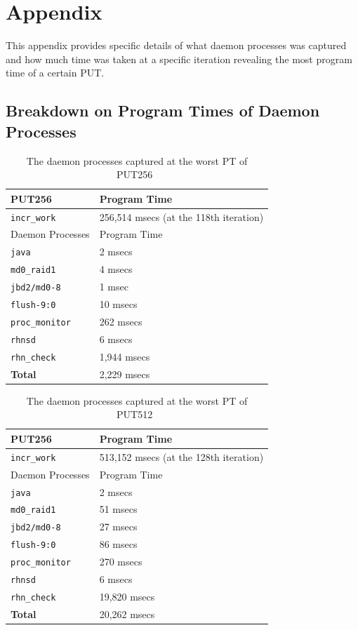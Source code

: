 \documentclass[10pt]{article}
\begin{document}
\clearpage
\newpage
\section{Appendix}
This appendix provides specific details of what daemon processes 
was captured and how much time was taken at a specific iteration revealing the most program time of a certain PUT.

\subsection{Breakdown on Program Times of Daemon Processes}
\begin{table}[htp!]
\centering
{
 \begin{tabular}{|l|l|} \hline
PUT256  & Program Time \\ \hline
{\tt incr\_work} & 256,514 msecs (at the 118th iteration)\\ \hline \hline
Daemon Processes  & Program Time \\ \hline
{\tt java} & 2 msecs\\ \hline
{\tt md0\_raid1} & 4 msecs\\ \hline
{\tt jbd2/md0-8} & 1 msec\\ \hline
{\tt flush-9:0} & 10 msecs\\ \hline
{\tt proc\_monitor} & 262 msecs\\ \hline
{\tt rhnsd} & 6 msecs\\ \hline
{\tt rhn\_check} & 1,944 msecs\\ \hline \hline
{\bf Total} & 2,229 msecs\\ \hline
  \end{tabular}
  }
 \caption{The daemon processes captured at the worst PT of PUT256~\label{fig:put256_daemon}}
\end{table}

\begin{table}[htp!]
\centering
{
 \begin{tabular}{|l|l|} \hline
PUT256  & Program Time \\ \hline
{\tt incr\_work} & 513,152 msecs (at the 128th iteration)\\ \hline \hline
Daemon Processes  & Program Time \\ \hline
{\tt java} & 2 msecs\\ \hline
{\tt md0\_raid1} & 51 msecs\\ \hline
{\tt jbd2/md0-8} & 27 msecs\\ \hline
{\tt flush-9:0} & 86 msecs\\ \hline
{\tt proc\_monitor} & 270 msecs\\ \hline
{\tt rhnsd} & 6 msecs\\ \hline
{\tt rhn\_check} & 19,820 msecs\\ \hline \hline
{\bf Total} & 20,262 msecs\\ \hline
  \end{tabular}
  }
 \caption{The daemon processes captured at the worst PT of PUT512~\label{fig:put512_daemon}}
\end{table}
\end{document}
